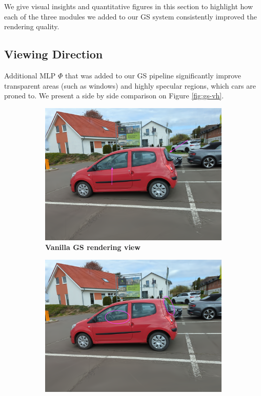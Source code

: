 We give visual insights and quantitative figures in this section to highlight how  each of the three modules we added to our GS system consistently improved the rendering quality. 

\subsection{Viewing Direction}

Additional MLP $\Phi$ that was added to our GS pipeline significantly improve transparent areas (such as windows) and highly specular regions, which cars are proned to.  We present a side by side comparison on Figure \ref{fig:gs-vh}. 


\begin{figure}[htb!]
  \centering
  \begin{subfigure}[b]{0.48\linewidth}
    \includegraphics[width=\linewidth]{images/gaussiansplatting/00023-gs.png}
    \caption{\textbf{Vanilla GS rendering view}}
    \label{fig:view3}
  \end{subfigure}
  \quad %
  \begin{subfigure}[b]{0.48\linewidth}
    \includegraphics[width=\linewidth]{images/gaussiansplatting/00023-gs-vd.png}

\end{subfigure}
\end{figure}

